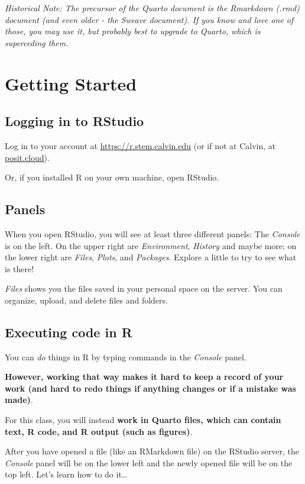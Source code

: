 \documentclass[
  letterpaper,
  DIV=11,
  numbers=noendperiod]{scrreprt}
\theoremstyle{remark}
\begin{document}
\emph{Historical Note: The precursor of the Quarto document is the
Rmarkdown (.rmd) document (and even older - the Sweave document). If you
know and love one of those, you may use it, but probably best to upgrade
to Quarto, which is superceding them.}

\section{Getting Started}\label{getting-started-1}

\subsection{Logging in to RStudio}\label{logging-in-to-rstudio}

Log in to your account at \url{https://r.stem.calvin.edu} (or if not at
Calvin, at \href{https://posit.cloud}{posit.cloud}).

Or, if you installed R on your own machine, open RStudio.

\subsection{Panels}\label{panels}

When you open RStudio, you will see at least three different panels: The
\emph{Console} is on the left. On the upper right are
\emph{Environment}, \emph{History} and maybe more; on the lower right
are \emph{Files}, \emph{Plots}, and \emph{Packages}. Explore a little to
try to see what is there!

\emph{Files} shows you the files saved in your personal space on the
server. You can organize, upload, and delete files and folders.

\subsection{Executing code in R}\label{executing-code-in-r}

You can \emph{do} things in R by typing commands in the \emph{Console}
panel.

\textbf{However, working that way makes it hard to keep a record of your
work (and hard to redo things if anything changes or if a mistake was
made)}.

For this class, you will instead \textbf{work in Quarto files, which can
contain text, R code, and R output (such as figures)}.

After you have opened a file (like an RMarkdown file) on the RStudio
server, the \emph{Console} panel will be on the lower left and the newly
opened file will be on the top left. Let's learn how to do it\ldots{}
\end{document}
